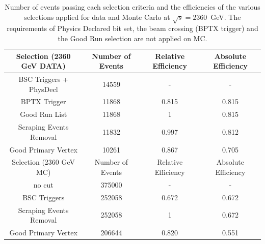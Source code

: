 \begin{table}[!ht]
  \begin{center}
    \begin{tabular}{|c|c|c|c|}
      \hline
      Selection (2360 GeV DATA) & Number of Events  & Relative Efficiency & Absolute Efficiency\\
      \hline\hline
      BSC Triggers + PhysDecl  & 14559             & -                   & -      \\ 
      BPTX Trigger             & 11868		   & 0.815               & 0.815  \\
      Good Run List            & 11868		   & 1		         & 0.815  \\
      Scraping Events Removal  & 11832		   & 0.997		 & 0.812  \\
      Good Primary Vertex      & 10261		   & 0.867		 & 0.705  \\
      \hline
      \hline
      \hline
      \hline
      Selection (2360 GeV MC)   & Number of Events  & Relative Efficiency & Absolute Efficiency\\
      \hline\hline
      no cut                   & 375000            & -                   & -      \\ 
      BSC Triggers	       & 252058		   & 0.672               & 0.672  \\ 
      Scraping Events Removal  & 252058		   & 1	                 & 0.672  \\
      Good Primary Vertex      & 206644		   & 0.820		 & 0.551  \\
      \hline
  \end{tabular}
    \caption{Number of events passing each selection criteria and
      the efficiencies of the various selections applied for data and Monte Carlo at $\sqrt{s}=2360$~GeV. 
      The requirements of Physics Declared bit set, the beam crossing (BPTX trigger) and the Good Run selection 
      are not applied on MC.}
    \label{tab:selectionefficiency_2360}
  \end{center}
\end{table}



